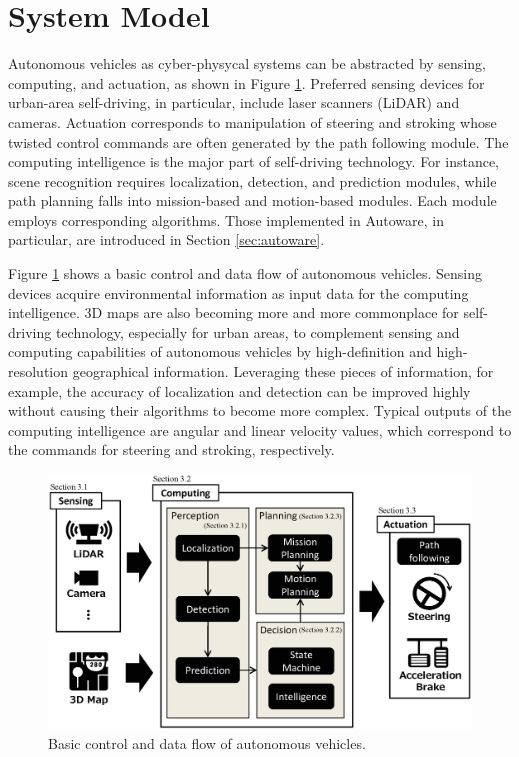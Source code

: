\section{System Model}
\label{sec:system_model}

Autonomous vehicles as cyber-physycal systems can be abstracted by
sensing, computing, and actuation, as shown in Figure
\ref{fig:system_model}.
Preferred sensing devices for urban-area self-driving, in particular,
include laser scanners (LiDAR) and cameras.
Actuation corresponds to manipulation of steering and stroking whose
twisted control commands are often generated by the path following module.
The computing intelligence is the major part of self-driving technology.
For instance, scene recognition requires localization, detection, and
prediction modules, while path planning falls into mission-based and
motion-based modules.
Each module employs corresponding algorithms.
Those implemented in Autoware, in particular, are introduced in Section
\ref{sec:autoware}.

Figure \ref{fig:system_model} shows a basic control and data flow of
autonomous vehicles.
Sensing devices acquire environmental information as input data for the
computing intelligence.
3D maps are also becoming more and more commonplace for self-driving
technology, especially for urban areas, to complement sensing and
computing capabilities of autonomous vehicles by high-definition and
high-resolution geographical information.
Leveraging these pieces of information, for example, the accuracy of
localization and detection can be improved highly without causing their
algorithms to become more complex.
Typical outputs of the computing intelligence are angular and linear
velocity values, which correspond to the commands for steering and
stroking, respectively.

\begin{figure}[htbp]
  \centering
  \includegraphics[width=0.9\linewidth]{../figure/system_model.eps}
  \caption{\label{fig:system_model}
    Basic control and data flow of autonomous vehicles.}
\end{figure}


